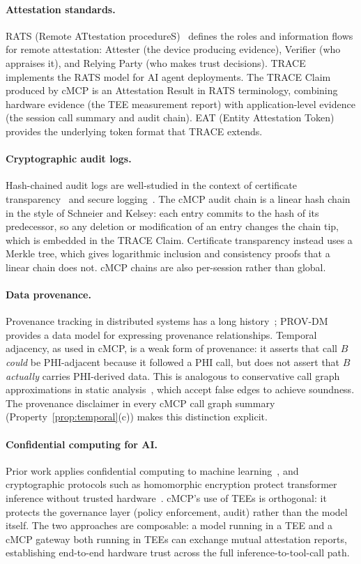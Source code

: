 \paragraph{Attestation standards.}
RATS (Remote ATtestation procedureS)~\citep{rats2021} defines the roles and information
flows for remote attestation: Attester (the device producing evidence), Verifier (who
appraises it), and Relying Party (who makes trust decisions). TRACE~\citep{trace2025}
implements the RATS model for AI agent deployments. The TRACE Claim produced by cMCP is
an Attestation Result in RATS terminology, combining hardware evidence (the TEE
measurement report) with application-level evidence (the session call summary and audit
chain). EAT (Entity Attestation Token)~\citep{eat2023} provides the underlying token
format that TRACE extends.

\paragraph{Cryptographic audit logs.}
Hash-chained audit logs are well-studied in the context of certificate
transparency~\citep{ct2013} and secure logging~\citep{seclog2000}. The cMCP audit chain
is a linear hash chain in the style of Schneier and Kelsey: each entry commits to the hash
of its predecessor, so any deletion or modification of an entry changes the chain tip,
which is embedded in the TRACE Claim. Certificate transparency instead uses a Merkle tree,
which gives logarithmic inclusion and consistency proofs that a linear chain does not.
cMCP chains are also per-session rather than global.

\paragraph{Data provenance.}
Provenance tracking in distributed systems has a long history~\citep{prov2013}; PROV-DM
provides a data model for expressing provenance relationships. Temporal adjacency, as used
in cMCP, is a weak form of provenance: it asserts that call $B$ \emph{could} be
PHI-adjacent because it followed a PHI call, but does not assert that $B$ \emph{actually}
carries PHI-derived data. This is analogous to conservative call graph approximations in
static analysis~\citep{reps1995}, which accept false edges to achieve soundness. The
provenance disclaimer in every cMCP call graph summary (Property~\ref{prop:temporal}(c))
makes this distinction explicit.

\paragraph{Confidential computing for AI.}
Prior work applies confidential computing to machine learning~\citep{confai2024}, and
cryptographic protocols such as homomorphic encryption protect transformer inference
without trusted hardware~\citep{teeinference2023}. cMCP's use of TEEs is orthogonal: it
protects the governance layer (policy enforcement, audit) rather than the model itself.
The two approaches are composable: a model running in a TEE and a cMCP gateway both
running in TEEs can exchange mutual attestation reports, establishing end-to-end hardware
trust across the full inference-to-tool-call path.

